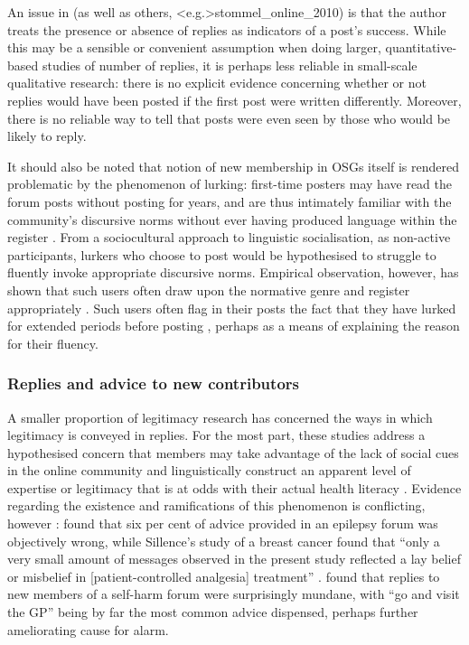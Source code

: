 		 An issue in \textcite{horne_doing_2009} (as well as others, {stommel_online_2010}) is that the author treats the presence or absence of replies as indicators of a post's success. While this may be a sensible or convenient assumption when doing larger, quantitative-based studies of number of replies, it is perhaps less reliable in small-scale qualitative research: there is no explicit evidence concerning whether or not replies would have been posted if the first post were written differently. Moreover, there is no reliable way to tell that posts were even seen by those who would be likely to reply.

		 It should also be noted that notion of new membership in OSGs itself is rendered problematic by the phenomenon of lurking: first-time posters may have read the forum posts without posting for years, and are thus intimately familiar with the community's discursive norms without ever having produced language within the register \cite{dennen_pedagogical_2008,han_social_2012,preece_top_2004,smithson_membership_2011}. From a sociocultural approach to linguistic socialisation, as non-active participants, lurkers who choose to post would be hypothesised to struggle to fluently invoke appropriate discursive norms. Empirical observation, however, has shown that such users often draw upon the normative genre and register appropriately \cite{weber_missed_2011}. Such users often flag in their posts the fact that they have lurked for extended periods before posting \cite{weber_missed_2011}, perhaps as a means of explaining the reason for their fluency.

		 \subsubsection{Replies and advice to new contributors}

			A smaller proportion of legitimacy research has concerned the ways in which legitimacy is conveyed in replies. For the most part, these studies address a hypothesised concern that members may take advantage of the lack of social cues in the online community and linguistically construct an apparent level of expertise or legitimacy that is at odds with their actual health literacy \cite{varga_grieving_2013}. Evidence regarding the existence and ramifications of this phenomenon is conflicting, however \cite{sillence_giving_2013}: \textcite{hoch_information_1999} found that six per cent of advice provided in an epilepsy forum was objectively wrong, while Sillence's study of a breast cancer found that ``only a very small amount of messages observed in the present study reflected a lay belief or misbelief in  [patient-controlled analgesia] treatment'' \citeyear[p.~8]{sillence_communicating_2012}. \textcite{smithson_problem_2011} found that replies to new members of a self-harm forum were surprisingly mundane, with ``go and visit the GP'' being by far the most common advice dispensed, perhaps further ameliorating cause for alarm.

